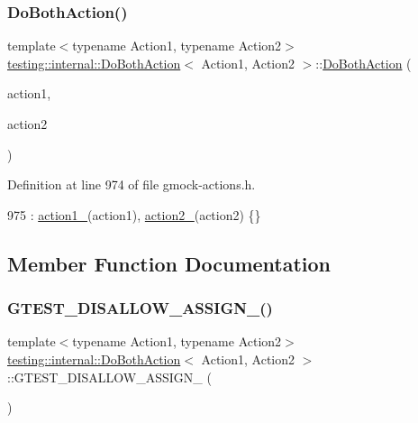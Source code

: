 \subsubsection{\texorpdfstring{Do\+Both\+Action()}{DoBothAction()}}
{\footnotesize\ttfamily template$<$typename Action1, typename Action2$>$ \\
\hyperlink{classtesting_1_1internal_1_1DoBothAction}{testing\+::internal\+::\+Do\+Both\+Action}$<$ Action1, Action2 $>$\+::\hyperlink{classtesting_1_1internal_1_1DoBothAction}{Do\+Both\+Action} (\begin{DoxyParamCaption}\item[{Action1}]{action1,  }\item[{Action2}]{action2 }\end{DoxyParamCaption})\hspace{0.3cm}{\ttfamily [inline]}}



Definition at line 974 of file gmock-\/actions.\+h.


\begin{DoxyCode}
975       : \hyperlink{classtesting_1_1internal_1_1DoBothAction_af747366f4d0117d1058c6288bb152122}{action1\_}(action1), \hyperlink{classtesting_1_1internal_1_1DoBothAction_a414a3fe2381da32b235524338bbb592e}{action2\_}(action2) \{\}
\end{DoxyCode}


\subsection{Member Function Documentation}
\mbox{\label{classtesting_1_1internal_1_1DoBothAction_a3428a1598ba58759f1a3f7d4443d6490}} 
\subsubsection{\texorpdfstring{G\+T\+E\+S\+T\+\_\+\+D\+I\+S\+A\+L\+L\+O\+W\+\_\+\+A\+S\+S\+I\+G\+N\+\_\+()}{GTEST\_DISALLOW\_ASSIGN\_()}}
{\footnotesize\ttfamily template$<$typename Action1, typename Action2$>$ \\
\hyperlink{classtesting_1_1internal_1_1DoBothAction}{testing\+::internal\+::\+Do\+Both\+Action}$<$ Action1, Action2 $>$\+::G\+T\+E\+S\+T\+\_\+\+D\+I\+S\+A\+L\+L\+O\+W\+\_\+\+A\+S\+S\+I\+G\+N\+\_\+ (\begin{DoxyParamCaption}\item[{\hyperlink{classtesting_1_1internal_1_1DoBothAction}{Do\+Both\+Action}$<$ Action1, Action2 $>$}]{ }\end{DoxyParamCaption})\hspace{0.3cm}{\ttfamily [private]}}

